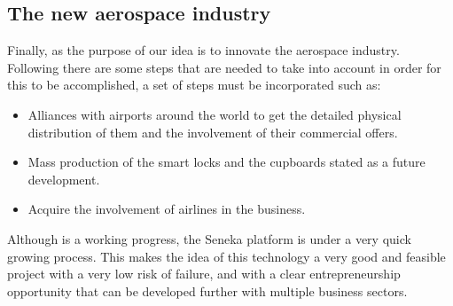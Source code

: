 \documentclass[12pt]{article}
\begin{document}
\subsection{The new aerospace industry}

Finally, as the purpose of our idea is to innovate the aerospace industry. Following there are some steps that are needed to take into account in order for this to be accomplished, a set of  steps must be incorporated such as:\\
\begin{itemize}
	\item Alliances with airports around the world to get the detailed physical distribution of them and the involvement of their commercial offers.
	\item Mass production of the smart locks and the cupboards stated as a future development.
	\item Acquire the involvement of airlines in the business.
\end{itemize}

Although is a working progress, the Seneka platform is under a very quick growing process. This makes the idea of this technology a very good and feasible project with a very low risk of failure, and with a clear entrepreneurship opportunity that can be developed further with multiple business sectors.

\end{document}
